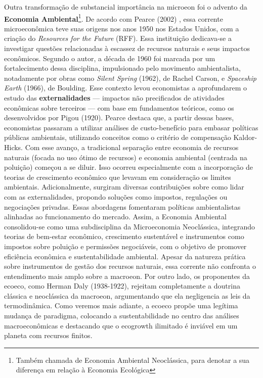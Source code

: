 \documentclass[./main.tex]{subfiles}
\begin{document}
\par Outra transformação de substancial importância na \gls{microeon} foi o advento da \textbf{Economia Ambiental}\footnote{Também chamada de Economia Ambiental Neoclássica, para denotar a sua diferença em relação à Economia Ecológica}. De acordo com Pearce (2002) \cite{Pearce2002a}, essa corrente microeconômica teve suas origens nos anos 1950 nos Estados Unidos, com a criação do \textit{Resources for the Future} (RFF). Essa instituição dedicava-se a investigar questões relacionadas à escassez de recursos naturais e seus impactos econômicos. Segundo o autor, a década de 1960 foi marcada por um fortalecimento dessa disciplina, impulsionado pelo movimento ambientalista, notadamente por obras como \textit{Silent Spring} (1962), de Rachel Carson, e \textit{Spaceship Earth} (1966), de Boulding. Esse contexto levou economistas a aprofundarem o estudo das \textbf{externalidades} — impactos não precificados de atividades econômicas sobre terceiros — com base em fundamentos teóricos, como os desenvolvidos por Pigou (1920). Pearce destaca que, a partir dessas bases, economistas passaram a utilizar análises de custo-benefício para embasar políticas públicas ambientais, utilizando conceitos como o critério de compensação Kaldor-Hicks. Com esse avanço, a tradicional separação entre economia de recursos naturais (focada no uso ótimo de recursos) e economia ambiental (centrada na poluição) começou a se diluir. Isso ocorreu especialmente com a incorporação de teorias de crescimento econômico que levavam em consideração os limites ambientais. Adicionalmente, surgiram diversas contribuições sobre como lidar com as externalidades, propondo soluções como impostos, regulações ou negociações privadas. Essas abordagens fomentaram políticas ambientalistas alinhadas ao funcionamento do mercado. Assim, a Economia Ambiental consolidou-se como uma subdisciplina da Microeconomia Neoclássica, integrando teorias de bem-estar econômico, crescimento sustentável e instrumentos como impostos sobre poluição e permissões negociáveis, com o objetivo de promover eficiência econômica e sustentabilidade ambiental. Apesar da natureza prática sobre instrumentos de gestão dos recursos naturais, essa corrente não confronta o entendimento mais amplo sobre a \gls{macroeon}. Por outro lado, os proponentes da \gls{ecoeco}, como Herman Daly (1938-1922), rejeitam completamente a doutrina clássica e neoclássica da \gls{macroeon}, argumentando que ela negligencia as leis da termodinâmica. Como veremos mais adiante, a \gls{ecoeco} propõe uma legítima mudança de \gls{paradigma}, colocando a sustentabilidade no centro das análises macroeconômicas e destacando que o \gls{ecogrowth} ilimitado é inviável em um planeta com recursos finitos. 
\end{document}
